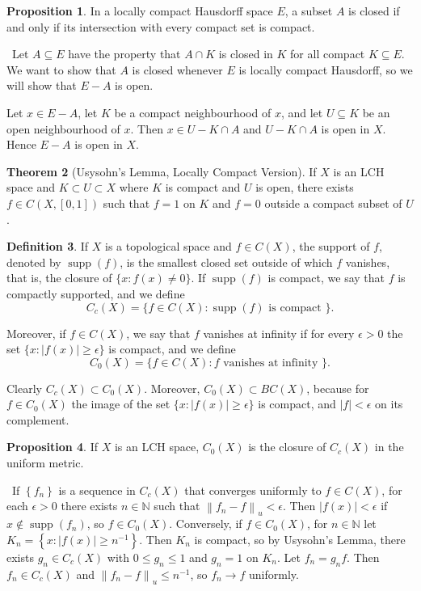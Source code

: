 \documentclass[12pt,a4paper]{book}
\newenvironment{prooff}{{\noindent\it\textcolor{cyan!40!black}{Proof}:}\,}{\par}
\theoremstyle{definition}
\newtheorem{defn}{Definition}[section]
\newtheorem{theo}[defn]{Theorem}
\newtheorem{prop}[defn]{Proposition}
\begin{document}
\begin{prop}
    In a locally compact Hausdorff space $E$, a subset $A$ is closed if and only if its
    intersection with every compact set is compact. 
\end{prop}
\begin{prooff}
    Let $A \subseteq E$ have the property that $A \cap K$ is closed in $K$ for all compact $K \subseteq E$. We want to show that $A$ is closed whenever $E$ is locally compact Hausdorff, so we will show that $E-A$ is open.

    Let $x \in E- A$, let $K$ be a compact neighbourhood of $x$, and let $U \subseteq K$ be an open neighbourhood of $x$. Then $x\in U-K\cap A$ and $U-K\cap A$ is open in $X$. Hence $E-A$ is open in $X$.
\end{prooff}
\begin{theo}[Usysohn's Lemma, Locally Compact Version]
    If $X$ is an LCH space and $K \subset U \subset X$ where $K$ is compact and $U$ is open, there exists $f \in C(X,[0,1])$ such that $f=1$ on $K$ and $f=0$ outside a compact subset of $U$.
\end{theo}
\begin{defn}
    If $X$ is a topological space and $f \in C(X)$, the support of $f$, denoted by $\operatorname{supp}(f)$, is the smallest closed set outside of which $f$ vanishes, that is, the closure of $\{x: f(x) \neq 0\}$. If $\operatorname{supp}(f)$ is compact, we say that $f$ is compactly supported, and we define
    $$
        C_c(X)=\{f \in C(X): \operatorname{supp}(f) \text { is compact }\} .
    $$

    Moreover, if $f \in C(X)$, we say that $f$ vanishes at infinity if for every $\epsilon>0$ the set $\{x:|f(x)| \geq \epsilon\}$ is compact, and we define
    $$
        C_0(X)=\{f \in C(X): f \text { vanishes at infinity }\} .
    $$

    Clearly $C_c(X) \subset C_0(X)$. Moreover, $C_0(X) \subset B C(X)$, because for $f \in C_0(X)$ the image of the set $\{x:|f(x)| \geq \epsilon\}$ is compact, and $|f|<\epsilon$ on its complement.
\end{defn}
\begin{prop}
    If $X$ is an LCH space, $C_0(X)$ is the closure of $C_c(X)$ in the uniform metric.
\end{prop}
\begin{prooff}
    If $\left\{f_n\right\}$ is a sequence in $C_c(X)$ that converges uniformly
    to $f \in C(X)$, for each $\epsilon>0$ there exists $n \in \mathbb{N}$ such that $\left\|f_n-f\right\|_u<\epsilon$. Then $|f(x)|<\epsilon$ if $x \notin \operatorname{supp}\left(f_n\right)$, so $f \in C_0(X)$. Conversely, if $f \in C_0(X)$, for $n \in \mathbb{N}$ let $K_n=\left\{x:|f(x)| \geq n^{-1}\right\}$. Then $K_n$ is compact,
    so by Usysohn's Lemma, there exists $g_n \in C_c(X)$ with $0 \leq g_n \leq 1$ and $g_n=1$ on $K_n$. Let $f_n=g_n f$. Then $f_n \in C_c(X)$ and $\left\|f_n-f\right\|_u \leq n^{-1}$, so $f_n \rightarrow f$ uniformly.
\end{prooff}
\end{document}

